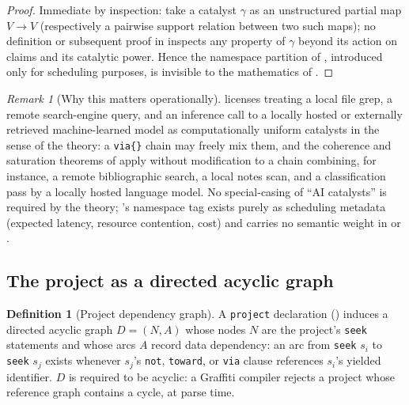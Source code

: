 \documentclass[11pt,twocolumn,a4paper]{article}
\theoremstyle{thmstyle}
\theoremstyle{definition}
\newtheorem{definition}[theorem]{Definition}
\theoremstyle{remark}
\newtheorem{remark}[theorem]{Remark}
\newcommand{\V}{V}
\begin{document}
\begin{proof}
Immediate by inspection:  take a
catalyst $\gamma$ as an unstructured partial map $\V\to\V$ (respectively a
pairwise support relation between two such maps); no definition or
subsequent proof in  inspects any property of $\gamma$
beyond its action on claims and its catalytic power. Hence the namespace
partition of , introduced only for scheduling purposes,
is invisible to the mathematics of .
\end{proof}

\begin{remark}[Why this matters operationally]
\label{rem:namespace-remark}
 licenses treating a local file grep, a remote
search-engine query, and an inference call to a locally hosted or
externally retrieved machine-learned model as computationally uniform
catalysts in the sense of the theory: a \texttt{via\{\}} chain may freely
mix them, and the coherence and saturation theorems of
 apply without modification to a chain combining, for
instance, a remote bibliographic search, a local notes scan, and a
classification pass by a locally hosted language model. No special-casing
of ``AI catalysts'' is required by the theory; 's
namespace tag exists purely as scheduling metadata (expected latency,
resource contention, cost) and carries no semantic weight in
 or .
\end{remark}

\subsection{The project as a directed acyclic graph}

\begin{definition}[Project dependency graph]
\label{def:project-dag}
A \texttt{project} declaration () induces a directed
acyclic graph $D=(N,A)$ whose nodes $N$ are the project's \texttt{seek}
statements and whose arcs $A$ record data dependency: an arc from
\texttt{seek} $s_i$ to \texttt{seek} $s_j$ exists whenever $s_j$'s
\texttt{not}, \texttt{toward}, or \texttt{via} clause references $s_i$'s
yielded identifier. $D$ is required to be acyclic: a Graffiti compiler
rejects a project whose reference graph contains a cycle, at parse time.
\end{definition}
\end{document}
